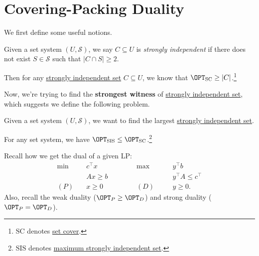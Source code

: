 \section{Covering-Packing Duality}
We first define some useful notions.
\begin{definition}\label{def:strongly-independent}
	Given a set system \((U, \mathcal{S} )\), we say \(C\subseteq U\) is \emph{strongly independent} if there does not exist \(S\in \mathcal{S} \) such that \(\left\vert C \cap S \right\vert \geq 2\).
\end{definition}

\begin{remark}
	Then for any \hyperref[def:strongly-independent]{strongly independent set} \(C\subseteq U\), we know that \(\OPT_{\mathrm{SC}} \geq \left\vert C \right\vert\).\footnote{\(\mathrm{SC}\) denotes \hyperref[prb:set-cover]{set cover}.}
\end{remark}

Now, we're trying to find the \textbf{strongest witness} of \hyperref[def:strongly-independent]{strongly independent set}, which suggests we define the following problem.

\begin{problem}\label{prb:max-strongly-independent-set}
Given a set system \((U, \mathcal{S} )\), we want to find the largest \hyperref[def:strongly-independent]{strongly independent set}.
\end{problem}

\begin{remark}
	For any set system, we have \(\OPT_{\mathrm{SIS}}\leq \OPT_{\mathrm{SC}}\).\footnote{\(\mathrm{SIS}\) denotes \hyperref[prb:max-strongly-independent-set]{maximum strongly independent set}.}
\end{remark}

\begin{prev}[LP dual]
	Recall how we get the dual of a given LP:
	\[
		\begin{alignedat}{5}
			\min~&c^{\top}x\qquad\qquad&&\max ~&&y^{\top} b\\
			&Ax \geq b 				&&		&&y^{\top} A\leq c^{\top} \\
			(P)\quad	&x\geq  0 	&&(D)\quad&& y\geq 0.
		\end{alignedat}
	\]
	Also, recall the weak duality (\(\OPT_{P} \geq \OPT_D\)) and strong duality (\(\OPT_P = \OPT_D\)).
\end{prev}


